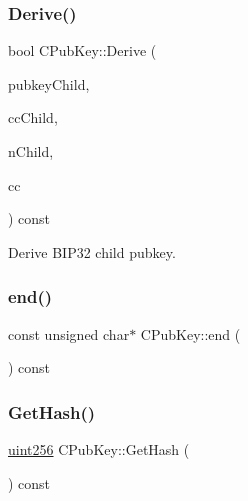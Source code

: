 \subsubsection{\texorpdfstring{Derive()}{Derive()}}
{\footnotesize\ttfamily bool C\+Pub\+Key\+::\+Derive (\begin{DoxyParamCaption}\item[{\mbox{\hyperlink{class_c_pub_key}{C\+Pub\+Key}} \&}]{pubkey\+Child,  }\item[{\mbox{\hyperlink{hash_8h_aa201a9867f780a040c7af908e0a85db3}{Chain\+Code}} \&}]{cc\+Child,  }\item[{unsigned int}]{n\+Child,  }\item[{const \mbox{\hyperlink{hash_8h_aa201a9867f780a040c7af908e0a85db3}{Chain\+Code}} \&}]{cc }\end{DoxyParamCaption}) const}



Derive B\+I\+P32 child pubkey. 

\mbox{\label{class_c_pub_key_a1d6fb1ec2b45fb229f549215d6a23dbc}} 
\subsubsection{\texorpdfstring{end()}{end()}}
{\footnotesize\ttfamily const unsigned char$\ast$ C\+Pub\+Key\+::end (\begin{DoxyParamCaption}{ }\end{DoxyParamCaption}) const\hspace{0.3cm}{\ttfamily [inline]}}

\mbox{\label{class_c_pub_key_ab1aaa3f6085a3e9bc034d3e1269d870d}} 
\subsubsection{\texorpdfstring{Get\+Hash()}{GetHash()}}
{\footnotesize\ttfamily \mbox{\hyperlink{classuint256}{uint256}} C\+Pub\+Key\+::\+Get\+Hash (\begin{DoxyParamCaption}{ }\end{DoxyParamCaption}) const\hspace{0.3cm}{\ttfamily [inline]}}



